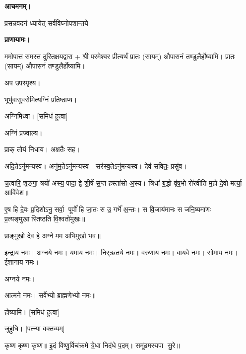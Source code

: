 
\textbf{आचमनम्।}

{प्रसन्नवदनं ध्यायेत् सर्वविघ्नोपशान्तये}
 
\textbf{प्राणायामः।} 

ममोपात्त समस्त दुरितक्षयद्वारा + श्री परमेश्वर प्रीत्यर्थं प्रातः (सायम्) औपासनं तण्डुलैर्होष्यामि। प्रातः (सायम्) औपासनं तण्डुलैर्होष्यामि।

अप उपस्पृश्य।


भूर्भुवः॒सुव॒रोमित्यग्निं प्रतिष्ठाप्य।

अग्निमिध्वा। [समिधं हुत्वा]

अग्निं प्रज्वाल्य।

प्राक् तोयं निधाय। अक्षतैः सह।

अदि॒तेऽनु॑मन्यस्व। अनु॑म॒तेऽनु॑मन्यस्व। सर॑स्व॒तेऽनु॑मन्यस्व। देव॑ सवितः॒ प्रसु॑व।


च॒त्वारि॒ शृङ्गा॒ त्रयो॑ अस्य॒ पादा॒ द्वे शी॒र्\mbox{}षे स॒प्त हस्ता॑सो अ॒स्य। त्रिधा॑ ब॒द्धो वृ॑ष॒भो रो॑रवीति म॒हो दे॒वो मर्त्या॒ आवि॑वेश॥

ए॒ष हि दे॒वः प्र॒दिशोऽनु॒ सर्वा॒ पूर्वो॑ हि जा॒तः स उ॒ गर्भे॑ अ॒न्तः। स वि॒जाय॑मानः स जनि॒ष्यमा॑णः प्र॒त्यङ्मुखास्तिष्ठति वि॒श्वतो॑मुखः॥ 

प्राङ्मुखो देव हे अग्ने मम अभिमुखो भव॥

इन्द्राय नमः। अग्नये नमः। यमाय नमः। निर्‌ऋतये नमः। 
वरुणाय नमः। वायवे नमः। सोमाय नमः। ईशानाय नमः। 

अग्नये नमः। 






आत्मने नमः। सर्वेभ्यो ब्राह्मणेभ्यो नमः॥



होष्यामि। [समिधं हुत्वा]

जुहुधि। [पत्न्या वक्तव्यम्]

कृष्ण कृष्ण कृष्ण॥ इ॒दं विष्णु॒र्विच॑क्रमे त्रे॒धा निद॑धे प॒दम्। समू॑ढमस्यपा सु॒रे॥


